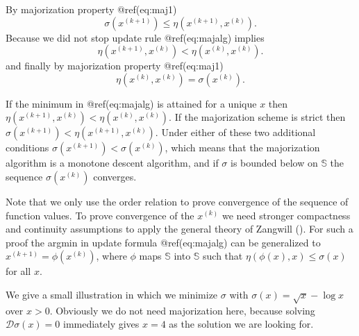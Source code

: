 \documentclass[
  12pt,
  letterpaper,
  DIV=11,
  numbers=noendperiod]{scrartcl}
\theoremstyle{plain}
\theoremstyle{remark}
\begin{document}
By majorization property @ref(eq:maj1) \begin{equation}
\sigma(x^{(k+1)})\leq\eta(x^{(k+1)},x^{(k)}).
\end{equation} Because we did not stop update rule @ref(eq:majalg)
implies \begin{equation}
\eta(x^{(k+1)},x^{(k)})<\eta(x^{(k)},x^{(k)}).
\end{equation} and finally by majorization property @ref(eq:maj1)
\begin{equation}
\eta(x^{(k)},x^{(k)})=\sigma(x^{(k)}).
\end{equation}

If the minimum in @ref(eq:majalg) is attained for a unique \(x\) then
\(\eta(x^{(k+1)},x^{(k)})<\eta(x^{(k)},x^{(k)})\). If the majorization
scheme is strict then \(\sigma(x^{(k+1)})<\eta(x^{(k+1)},x^{(k)})\).
Under either of these two additional conditions
\(\sigma(x^{(k+1)})<\sigma(x^{(k)})\), which means that the majorization
algorithm is a monotone descent algorithm, and if \(\sigma\) is bounded
below on \(\mathbb{S}\) the sequence \(\sigma(x^{(k)})\) converges.

Note that we only use the order relation to prove convergence of the
sequence of function values. To prove convergence of the \(x^{(k)}\) we
need stronger compactness and continuity assumptions to apply the
general theory of Zangwill (). For such
a proof the argmin in update formula @ref(eq:majalg) can be generalized
to \(x^{(k+1)}=\phi(x^{(k)})\), where \(\phi\) maps \(\mathbb{S}\) into
\(\mathbb{S}\) such that \(\eta(\phi(x),x)\leq\sigma(x)\) for all \(x\).

We give a small illustration in which we minimize \(\sigma\) with
\(\sigma(x)=\sqrt{x}-\log{x}\) over \(x>0\). Obviously we do not need
majorization here, because solving \(\mathcal{D}\sigma(x)=0\)
immediately gives \(x=4\) as the solution we are looking for.
\end{document}
